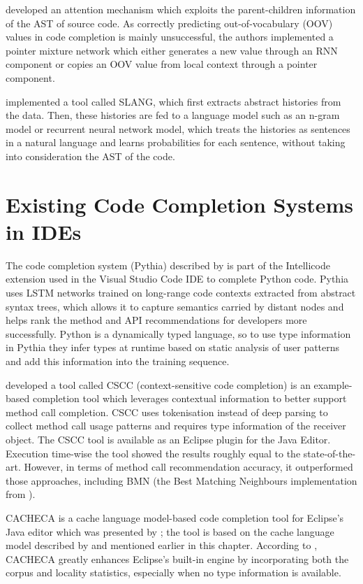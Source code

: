 \cite{Li17a} developed an attention mechanism which exploits the parent-children information of the AST of source code. As correctly predicting out-of-vocabulary (OOV) values in code completion is mainly unsuccessful, the authors implemented a pointer mixture network which either generates a new value through an RNN component or copies an OOV value from local context through a pointer component.

\cite{Rayc14a} implemented a tool called SLANG, which first extracts abstract histories from the data. Then, these histories are fed to a language model such as an n-gram model or recurrent neural network model, which treats the histories as sentences in a natural language and learns probabilities for each sentence, without taking into consideration the AST of the code.

\section{Existing Code Completion Systems in IDEs}
\label{sec:RelatedWorks-ExistingSystems}
The code completion system (Pythia) described by \cite{Svya19a} is part of the Intellicode extension used in the Visual Studio Code IDE to complete Python code. Pythia uses LSTM networks trained on long-range code contexts extracted from abstract syntax trees, which allows it to capture semantics carried by distant nodes and helps rank the method and API recommendations for developers more successfully. Python is a dynamically typed language, so to use type information in Pythia they infer types at runtime based on static analysis of user patterns and add this information into the training sequence.

\cite{Asad14a} developed a tool called CSCC (context-sensitive code completion) is an example-based completion tool which leverages contextual information to better support method call completion. CSCC uses tokenisation instead of deep parsing to collect method call usage patterns and requires type information of the receiver object. The CSCC tool is available as an Eclipse plugin for the Java Editor. Execution time-wise the tool showed the results roughly equal to the state-of-the-art. However, in terms of method call recommendation accuracy, it outperformed those approaches, including BMN (the Best Matching Neighbours implementation from \cite{Bruc09a}).

CACHECA is a cache language model-based code completion tool for Eclipse's Java editor which was presented by \cite{Fran15a}; the tool is based on the cache language model described by \cite{Tu14a} and mentioned earlier in this chapter. According to \cite{Fran15a}, CACHECA greatly enhances Eclipse's built-in engine by incorporating both the corpus and locality statistics, especially when no type information is available.

